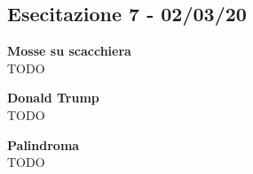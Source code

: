 \documentclass[../cheatSheetAlgoritmi.tex]{subfiles}
\begin{document}
\subsection{Esecitazione 7 - 02/03/20}
\textbf{Mosse su scacchiera}\\
TODO

\textbf{Donald Trump}\\
TODO

\textbf{Palindroma}\\
TODO

\newpage
\end{document}
